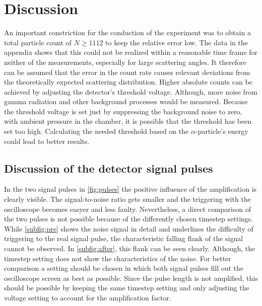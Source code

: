 \section{Discussion}
\label{sec:Diskussion}
An important constriction for the conduction of the experiment was to obtain a total particle count of $N \geq 1112$ to keep the relative error low.
The data in the appendix shows that this could not be realized within a reasonable time frame for neither of the measurements, especially for large scattering angles.
It therefore can be assumed that the error in the count rate causes relevant deviations from the theoretically expected scattering distribution.
\newline\noindent
Higher absolute counts can be achieved by adjusting the detector's threshold voltage.
Although, more noise from gamma radiation and other background processes would be measured.
Because the threshold voltage is set just by suppressing the background noise to zero, with ambient pressure in the chamber, it is possible that the threshold has been set too high.
Calculating the needed threshold based on the $\alpha$-particle's energy could lead to better results.
%
\subsection{Discussion of the detector signal pulses}
In the two signal pulses in \autoref{fig:pulses} the positive influence of the amplification is clearly visible.
The signal-to-noise ratio gets smaller and the triggering with the oscilloscope becomes easyer and less faulty.
Nevertheless, a direct comparison of the two pulses is not possible because of the differently chosen timestep settings.
While \autoref{subfig:pre} shows the noise signal in detail and underlines the difficulty of triggering to the real signal pulse, the characteristic falling flank of the signal cannot be observed.
In \autoref{subfig:after}, this flank can be seen clearly.
Although, the timestep setting does not show the characteristics of the noise.
\newline\noindent
For better comparison a setting should be chosen in which both signal pulses fill out the oscilloscope screen as best as possible.
Since the pulse length is not amplified, this should be possible by keeping the same timestep setting and only adjusting the voltage setting to account for the amplification factor.
%
